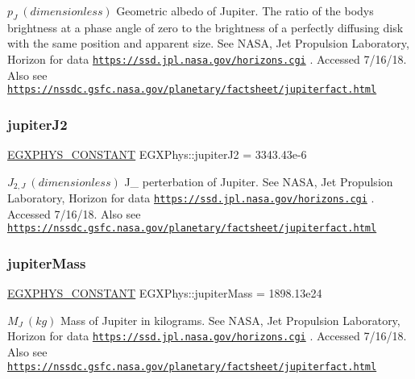 $ p_{J} \ (dimensionless)$ Geometric albedo of Jupiter. The ratio of the body\textquotesingle{}s brightness at a phase angle of zero to the brightness of a perfectly diffusing disk with the same position and apparent size. See N\+A\+SA, Jet Propulsion Laboratory, Horizon for data \href{https://ssd.jpl.nasa.gov/horizons.cgi}{\tt https\+://ssd.\+jpl.\+nasa.\+gov/horizons.\+cgi} . Accessed 7/16/18. Also see \href{https://nssdc.gsfc.nasa.gov/planetary/factsheet/jupiterfact.html}{\tt https\+://nssdc.\+gsfc.\+nasa.\+gov/planetary/factsheet/jupiterfact.\+html} \mbox{\label{group___e_g_x_phys-_constants-_astrophysics-_solar_system-_jupiter-_bulk_ga846f4c33b3e4089181cf11106c1a1441}} 
\subsubsection{\texorpdfstring{jupiter\+J2}{jupiterJ2}}
{\footnotesize\ttfamily \mbox{\hyperlink{group___e_g_x_phys-_constants-_macros_ga76980d288494ce1714c9ac68a95ba702}{E\+G\+X\+P\+H\+Y\+S\+\_\+\+C\+O\+N\+S\+T\+A\+NT}} E\+G\+X\+Phys\+::jupiter\+J2 = 3343.\+43e-\/6}

$ J_{2,J} \ (dimensionless)$ J\+\_ perterbation of Jupiter. See N\+A\+SA, Jet Propulsion Laboratory, Horizon for data \href{https://ssd.jpl.nasa.gov/horizons.cgi}{\tt https\+://ssd.\+jpl.\+nasa.\+gov/horizons.\+cgi} . Accessed 7/16/18. Also see \href{https://nssdc.gsfc.nasa.gov/planetary/factsheet/jupiterfact.html}{\tt https\+://nssdc.\+gsfc.\+nasa.\+gov/planetary/factsheet/jupiterfact.\+html} \mbox{\label{group___e_g_x_phys-_constants-_astrophysics-_solar_system-_jupiter-_bulk_ga8a78b1db0a9c538857855b43a3bc47e6}} 
\subsubsection{\texorpdfstring{jupiter\+Mass}{jupiterMass}}
{\footnotesize\ttfamily \mbox{\hyperlink{group___e_g_x_phys-_constants-_macros_ga76980d288494ce1714c9ac68a95ba702}{E\+G\+X\+P\+H\+Y\+S\+\_\+\+C\+O\+N\+S\+T\+A\+NT}} E\+G\+X\+Phys\+::jupiter\+Mass = 1898.\+13e24}

$M_{J} \ (kg)$ Mass of Jupiter in kilograms. See N\+A\+SA, Jet Propulsion Laboratory, Horizon for data \href{https://ssd.jpl.nasa.gov/horizons.cgi}{\tt https\+://ssd.\+jpl.\+nasa.\+gov/horizons.\+cgi} . Accessed 7/16/18. Also see \href{https://nssdc.gsfc.nasa.gov/planetary/factsheet/jupiterfact.html}{\tt https\+://nssdc.\+gsfc.\+nasa.\+gov/planetary/factsheet/jupiterfact.\+html} \mbox{\label{group___e_g_x_phys-_constants-_astrophysics-_solar_system-_jupiter-_bulk_ga50587ad8262cc8af606d31ba2cc00e37}} 
